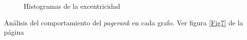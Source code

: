 \documentclass{article}
\begin{document}
\begin{figure}[htbp]
\caption{Histogramas de la excentricidad}
\label{Fig6} 
\end{figure}

Análisis del comportamiento del \textit{pagerank} en cada grafo. Ver figura \ref{Fig7} de la página \pageref{Fig7} 
\end{document}
